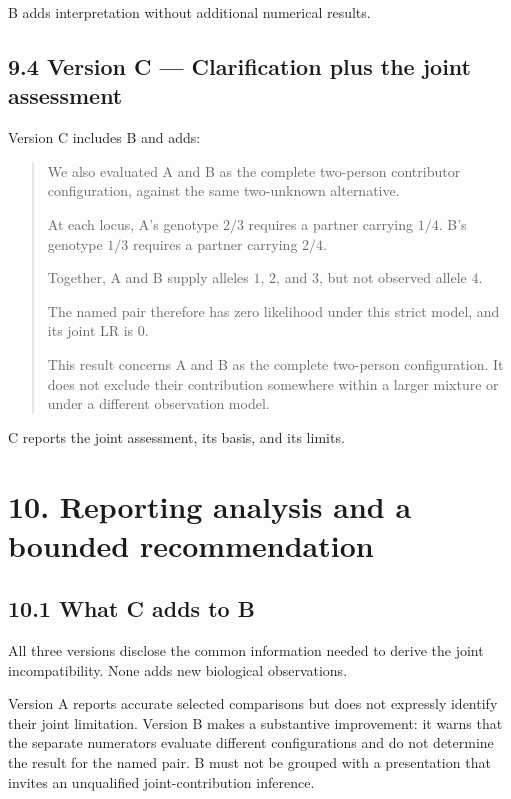 \documentclass[
]{article}
\begin{document}
B adds interpretation without additional numerical results.

\subsection{9.4 Version C --- Clarification plus the joint
assessment}\label{version-c-clarification-plus-the-joint-assessment}

Version C includes B and adds:

\begin{quote}
We also evaluated A and B as the complete two-person contributor
configuration, against the same two-unknown alternative.

At each locus, A's genotype \(2/3\) requires a partner carrying \(1/4\).
B's genotype \(1/3\) requires a partner carrying \(2/4\).

Together, A and B supply alleles \(1\), \(2\), and \(3\), but not
observed allele \(4\).

The named pair therefore has zero likelihood under this strict model,
and its joint LR is \(0\).

This result concerns A and B as the complete two-person configuration.
It does not exclude their contribution somewhere within a larger mixture
or under a different observation model.
\end{quote}

C reports the joint assessment, its basis, and its limits.

\section{10. Reporting analysis and a bounded
recommendation}\label{reporting-analysis-and-a-bounded-recommendation}

\subsection{10.1 What C adds to B}\label{what-c-adds-to-b}

All three versions disclose the common information needed to derive the
joint incompatibility. None adds new biological observations.

Version A reports accurate selected comparisons but does not expressly
identify their joint limitation. Version B makes a substantive
improvement: it warns that the separate numerators evaluate different
configurations and do not determine the result for the named pair. B
must not be grouped with a presentation that invites an unqualified
joint-contribution inference.
\end{document}
